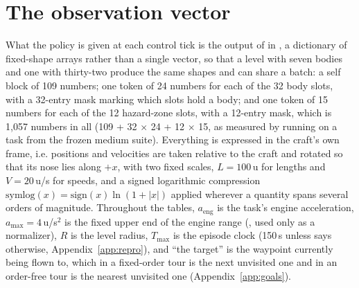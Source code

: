 
\section{The observation vector}
\label{app:obs}

What the policy is given at each control tick is the output of
 in , a dictionary of fixed-shape arrays
rather than a single vector, so that a level with seven bodies and one with
thirty-two produce the same shapes and can share a batch: a self block of 109
numbers; one token of 24 numbers for each of the 32 body slots, with a 32-entry
mask marking which slots hold a body; and one token of 15 numbers for each of
the 12 hazard-zone slots, with a 12-entry mask, which is 1,057 numbers in all
(109 + 32 $\times$ 24 + 12 $\times$ 15, as measured by running 
on a task from the frozen medium suite). Everything is expressed in the craft's
own frame, i.e. positions and velocities are taken relative to the craft and
rotated so that its nose lies along $+x$, with two fixed scales, $L = 100$\,u
for lengths and $V = 20$\,u/s for speeds, and a signed logarithmic compression
$\mathrm{symlog}(x) = \mathrm{sign}(x)\ln(1 + |x|)$ applied wherever a quantity
spans several orders of magnitude. Throughout the tables, $a_{\mathrm{eng}}$ is
the task's engine acceleration, $a_{\max} = 4$\,u/s$^2$ is the fixed upper end
of the engine range (, used only as a normalizer), $R$ is the
level radius, $T_{\max}$ is the episode clock (150\,s unless
 says otherwise, Appendix~\ref{app:repro}), and
``the target'' is the waypoint currently being flown to, which in a fixed-order
tour is the next unvisited one and in an order-free tour is the nearest
unvisited one (Appendix~\ref{app:goals}).


